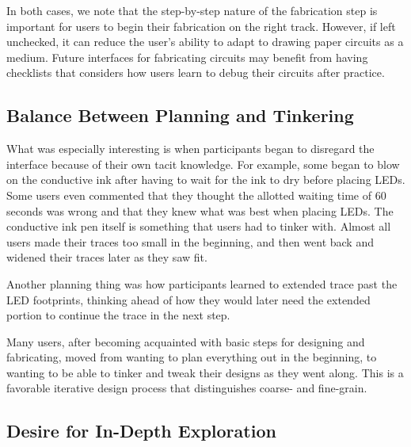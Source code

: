 \documentclass{sigchi}
\begin{document}
  In both cases, we note that the step-by-step nature of the fabrication step is important for users to begin their fabrication on the right track. However, if left unchecked, it can reduce the user's ability to adapt to drawing paper circuits as a medium. Future interfaces for fabricating circuits may benefit from having checklists that considers how users learn to debug their circuits after practice.
  

   \subsection{Balance Between Planning and Tinkering}
   
  What was especially interesting is when participants began to disregard the interface because of their own tacit knowledge. For example, some began to blow on the conductive ink after having to wait for the ink to dry before placing LEDs. Some users even commented that they thought the allotted waiting time of 60 seconds was wrong and that they knew what was best when placing LEDs. The conductive ink pen itself is something that users had to tinker with. Almost all users made their traces too small in the beginning, and then went back and widened their traces later as they saw fit.
  
  Another planning thing was how participants learned to extended trace past the LED footprints, thinking ahead of how they would later need the extended portion to continue the trace in the next step.
  
  Many users, after becoming acquainted with basic steps for designing and fabricating, moved from wanting to plan everything out in the beginning, to wanting to be able to tinker and tweak their designs as they went along. This is a favorable iterative design process that distinguishes coarse- and fine-grain.

  \subsection{Desire for In-Depth Exploration}
  
\end{document}
